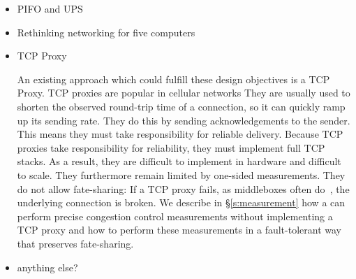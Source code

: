 \begin{itemize}
    \item PIFO and UPS
    \item Rethinking networking for five computers
    \item TCP Proxy
    \begin{outline}
    \1 An existing approach which could fulfill these design objectives is a TCP Proxy.
    \2 TCP proxies are popular in cellular networks
    \2 They are usually used to shorten the observed round-trip time of a connection, so it can quickly ramp up its sending rate.
    \2 They do this by sending acknowledgements to the sender.  
        \3 This means they must take responsibility for reliable delivery.
    \2 Because TCP proxies take responsibility for reliability, they must implement full TCP stacks.
        \3 As a result, they are difficult to implement in hardware and difficult to scale. 
    \2 They furthermore remain limited by one-sided measurements.
    \2 They do not allow fate-sharing:
        \3 If a TCP proxy fails, as middleboxes often do~\cite{aplomb}, the underlying connection is broken.
\1 We describe in \S\ref{s:measurement} how a \name can perform precise congestion control measurements without implementing a TCP proxy
    \2 and how to perform these measurements in a fault-tolerant way that preserves fate-sharing.
    \end{outline}
    \item anything else?
\end{itemize}